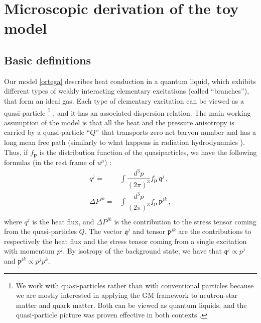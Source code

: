 \documentclass[a4paper, amsfonts, amssymb, amsmath, reprint, showkeys, nofootinbib, twoside, onecolumn, notitlepage]{revtex4-1}
\begin{document}
\appendix

\section{Microscopic derivation of the toy model}\label{AAA}

\subsection{Basic definitions}

Our model \ref{ortega} describes heat conduction in a quantum liquid, which exhibits different types of weakly interacting elementary excitations (called ``branches''), that form an ideal gas. Each type of elementary excitation can be viewed as a quasi-particle \footnote{We work with quasi-particles rather than with conventional particles because we are mostly interested in applying the GM framework to neutron-star matter and quark matter. Both can be viewed as quantum liquids, and the quasi-particle picture was proven effective in both contexts \cite{chamelhaensel2006,Nakano2020,Liu:2023kzy,Bluhm:2004xn,Mykhaylova:2020pfk,Li:2022ozl}.} \cite{Arteaga:2008ux}, and it has an associated dispersion relation. The main working assumption of the model is that all the heat and the pressure anisotropy is carried by a quasi-particle ``$Q$'' that transports zero net baryon number and has a long mean free path (similarly to what happens in radiation hydrodynamics \cite{Weinberg1971,UdeyIsrael1982}). Thus, if $f_\textbf{p}$ is the distribution function of the quasiparticles, we have the following formulas (in the rest frame of $u^\mu$) \cite{landau9,landau10,Popov:2006nc}:
\begin{equation}
\begin{split}
q^j={}& \int \dfrac{d^3 p}{(2\pi)^3} f_{\textbf{p}} \, \mathfrak{q}^j \, ,\\
\Delta P^{jk} ={}& \int \dfrac{d^3 p}{(2\pi)^3} f_{\textbf{p}} \, \mathfrak{p}^{jk} \, , \\
\end{split}
\end{equation}
where $q^j$ is the heat flux, and $\Delta P^{jk}$ is the contribution to the stress tensor coming from the quasi-particles $Q$. The vector $\mathfrak{q}^j$ and tensor $\mathfrak{p}^{jk}$ are the contributions to respectively the heat flux and the stress tensor coming from a single excitation with momentum $p^j$. By isotropy of the background state, we have that $\mathfrak{q}^j \propto p^j$ and $\mathfrak{p}^{jk} \propto p^j p^k$. 
\end{document}
